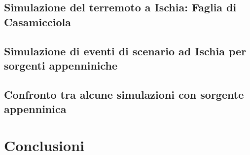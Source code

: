 \documentclass[a4paper,12pt,titlepage]{article}
\begin{document}
\subsection{Simulazione del terremoto a Ischia: Faglia di Casamicciola}
\subsection{ Simulazione di eventi di scenario ad Ischia per sorgenti appenniniche}
\subsection{Confronto tra alcune simulazioni con sorgente appenninica}

\section*{Conclusioni}
\end{document}
